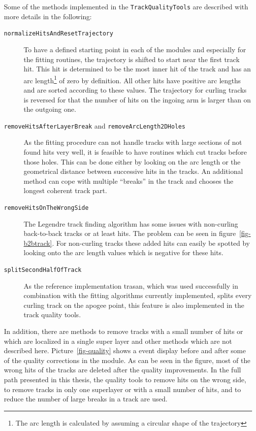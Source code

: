 Some of the methods implemented in the \texttt{TrackQualityTools} are described with more details in the following:
\begin{description}
 \item[\texttt{normalizeHitsAndResetTrajectory}] To have a defined starting point in each of the modules and especially for the fitting routines, the trajectory is shifted to start near the first track hit. This hit is determined to be the most inner hit of the track and has an arc length\footnote{The arc length is calculated by assuming a circular shape of the trajectory} of zero by definition. All other hits have positive arc lengths and are sorted according to these values. The trajectory for curling tracks is reversed for that the number of hits on the ingoing arm is larger than on the outgoing one.
 \item[\texttt{removeHitsAfterLayerBreak} and \texttt{removeArcLength2DHoles}]  As the fitting procedure can not handle tracks with large sections of not found hits very well, it is feasible to have routines which cut tracks before those holes. This can be done either by looking on the arc length or the geometrical distance between successive hits in the tracks. An additional method can cope with multiple ``breaks'' in the track and chooses the longest coherent track part.
 \item[\texttt{removeHitsOnTheWrongSide}] The Legendre track finding algorithm has some issues with non-curling back-to-back tracks or at least hits. The problem can be seen in figure~\ref{fig-b2btrack}. For non-curling tracks these added hits can easily be spotted by looking onto the arc length values which is negative for these hits.
 \item[\texttt{splitSecondHalfOfTrack}] As the reference implementation trasan, which was used successfully in combination with the fitting algorithms currently implemented, splits every curling track on the apogee point, this feature is also implemented in the track quality tools.
\end{description}
In addition, there are methods to remove tracks with a small number of hits or which are localized in a single super layer and other methods which are not described here. Picture~\ref{fig-quality} shows a event display before and after some of the quality corrections in the module. As can be seen in the figure, most of the wrong hits of the tracks are deleted after the quality improvements. In the full path presented in this thesis, the quality tools to remove hits on the wrong side, to remove tracks in only one superlayer or with a small number of hits, and to reduce the number of large breaks in a track are used.

